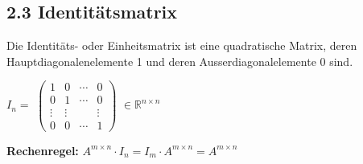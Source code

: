 \subsection{2.3 Identitätsmatrix}{

\vskip1pt
Die Identitäts- oder Einheitsmatrix ist eine quadratische Matrix, deren Hauptdiagonalenelemente 1 und deren Ausserdiagonalelemente 0 sind.

\begin{center}
$I_n =$
$\begin{pmatrix}
1 & 0 & \dotsm & 0 \\
0 & 1 & \dotsm & 0 \\
\vdots & \vdots & & \vdots \\
0 & 0 & \dotsm & 1
\end{pmatrix}$
$\in \mathbb{R}^{n \times n}$
\end{center}

\textbf{Rechenregel:}
$A^{m \times n} \cdot I_n = I_m \cdot A^{m \times n} = A^{m \times n}$

}
\WhiteSpace